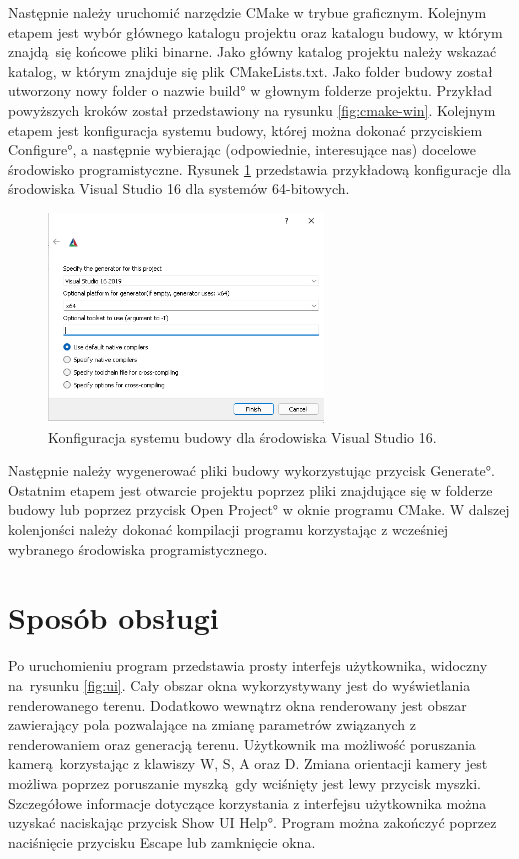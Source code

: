 Następnie należy uruchomić narzędzie CMake w trybue graficznym.
Kolejnym etapem jest wybór głównego katalogu projektu oraz katalogu budowy, w którym znajdą się końcowe pliki binarne.
Jako główny katalog projektu należy wskazać katalog, w którym znajduje się plik CMakeLists.txt.
Jako folder budowy został utworzony nowy folder o nazwie \ang{build} w głownym folderze projektu.
Przykład powyższych kroków został przedstawiony na rysunku \ref{fig:cmake-win}.
Kolejnym etapem jest konfiguracja systemu budowy, której można dokonać przyciskiem \ang{Configure}, a następnie wybierając (odpowiednie, interesujące nas) docelowe środowisko programistyczne. Rysunek \ref{fig:cmake-conf} przedstawia przykładową konfiguracje dla środowiska Visual Studio 16 dla systemów 64-bitowych.

\begin{figure}
\centering
\includegraphics[width=0.65\textwidth]{./graf/cmake-conf.png}
\caption{Konfiguracja systemu budowy dla środowiska Visual Studio 16.}
\label{fig:cmake-conf}
\end{figure}

Następnie należy wygenerować pliki budowy wykorzystując przycisk \ang{Generate}.
Ostatnim etapem jest otwarcie projektu poprzez pliki znajdujące się w folderze budowy lub poprzez przycisk \ang{Open Project} w oknie programu CMake. W dalszej kolenjonści należy dokonać kompilacji programu korzystając z wcześniej wybranego środowiska programistycznego.

\section{Sposób obsługi}
Po uruchomieniu program przedstawia prosty interfejs użytkownika, widoczny na~rysunku \ref{fig:ui}. Cały
obszar okna wykorzystywany jest do wyświetlania renderowanego terenu.
Dodatkowo wewnątrz okna renderowany jest obszar zawierający pola
pozwalające na zmianę parametrów związanych z renderowaniem oraz generacją
terenu. Użytkownik ma możliwość poruszania kamerą korzystając z klawiszy W, S, A oraz D. Zmiana orientacji kamery jest możliwa poprzez poruszanie myszką gdy wciśnięty jest lewy przycisk myszki. Szczegółowe informacje dotyczące korzystania z interfejsu użytkownika można uzyskać naciskając przycisk \ang{Show UI Help}. Program można zakończyć poprzez naciśnięcie przycisku Escape lub zamknięcie okna.

